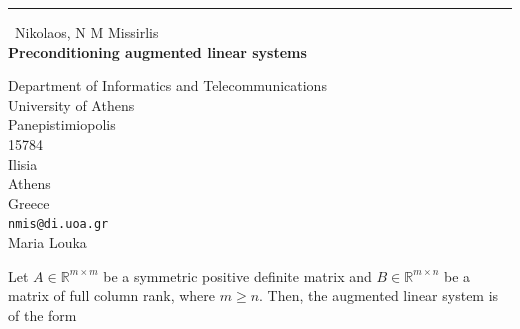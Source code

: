 \documentclass{report}
\begin{document}
\begin{center}
\rule{6in}{1pt} \
{\large Nikolaos, N M Missirlis \\
{\bf Preconditioning augmented linear systems}}

Department of Informatics and Telecommunications \\ University of Athens \\ Panepistimiopolis \\ 15784 \\ Ilisia \\ Athens \\ Greece
\\
{\tt nmis@di.uoa.gr}\\
Maria Louka\end{center}

Let $A \in \mathbb{R}^{m\times m}$ be a symmetric positive definite
matrix and $B\in\mathbb{R}^{m\times n}$ be a matrix of full column rank,
where $m\geq n$. Then, the augmented linear system is of the form
\end{document}
